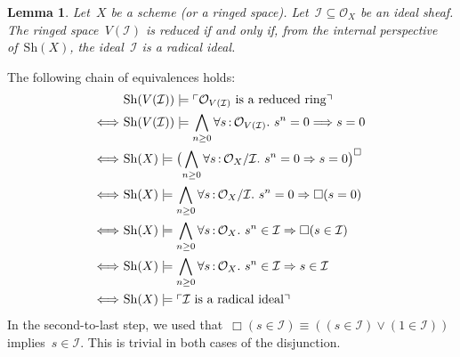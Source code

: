 \documentclass[10pt,reqno,a4paper]{amsbook}
\makeatletter
\theoremstyle{definition}
\theoremstyle{plain}
\newtheorem{lemma}[defn]{Lemma}
\theoremstyle{remark}
\renewcommand{\O}{\mathcal{O}}
\newcommand{\I}{\mathcal{I}}
\newcommand{\Sh}{\mathrm{Sh}}
\newcommand{\?}{\,{:}\,}
\renewcommand{\_}{\mathpunct{.}\,}
\newcommand{\speak}[1]{\ulcorner\text{\textnormal{#1}}\urcorner}
\renewenvironment{proof}[1][\proofname]{\par
  \pushQED{\qed}%
  \normalfont \topsep6\p@\@plus6\p@\relax
  \trivlist
  \item[\hskip\labelsep
        \itshape
    #1\@addpunct{.}]\ignorespaces
}{%
  \popQED\endtrivlist\@endpefalse
}
\makeatother
\begin{document}
\begin{lemma}\label{lemma:closed-subspace-reduced}
Let~$X$ be a scheme (or a ringed space). Let~$\I \subseteq \O_X$ be
an ideal sheaf. The ringed space~$V(\I)$ is reduced if and only if, from the
internal perspective of~$\Sh(X)$, the ideal~$\I$ is a radical ideal.\end{lemma}
\begin{proof}The following chain of equivalences holds:
\begin{align*}
  &\ \Sh(V(\I)) \models \speak{$\O_{V(\I)}$ is a reduced ring} \\
  \Longleftrightarrow&\
    \Sh(V(\I)) \models \bigwedge_{n \geq 0} \forall s\?\O_{V(\I)}\_
      s^n = 0 \Longrightarrow s = 0 \\
  \Longleftrightarrow&\
    \Sh(X) \models \bigl(\bigwedge_{n \geq 0} \forall s\?\O_X/\I\_ s^n = 0
    \Rightarrow s = 0\bigr)^\Box \\
  \Longleftrightarrow&\
    \Sh(X) \models \bigwedge_{n \geq 0} \forall s\?\O_X/\I\_ s^n = 0 \Rightarrow \Box(s = 0) \\
  \Longleftrightarrow&\
    \Sh(X) \models \bigwedge_{n \geq 0} \forall s\?\O_X\_ s^n \in \I
    \Rightarrow \Box(s \in \I) \\
  \Longleftrightarrow&\
    \Sh(X) \models \bigwedge_{n \geq 0} \forall s\?\O_X\_ s^n \in \I
    \Rightarrow s \in \I \\
  \Longleftrightarrow&\
    \Sh(X) \models \speak{$\I$ is a radical ideal}
\end{align*}
In the second-to-last step, we used that~$\Box(s \in \I) \equiv ((s \in \I) \vee
(1 \in \I))$ implies~$s \in \I$. This is trivial in both cases of the
disjunction.
\end{proof}
\end{document}
